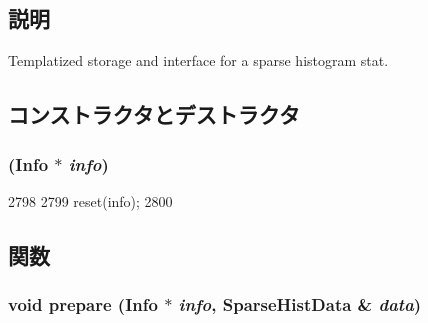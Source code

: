 \subsection{説明}
Templatized storage and interface for a sparse histogram stat. 

\subsection{コンストラクタとデストラクタ}
\hypertarget{classStats_1_1SparseHistStor_a967cbb09317bc988b824444b31e8d525}{
\subsubsection[{SparseHistStor}]{ ({\bf Info} $\ast$ {\em info})}}
\label{classStats_1_1SparseHistStor_a967cbb09317bc988b824444b31e8d525}



\begin{DoxyCode}
2798     {
2799         reset(info);
2800     }
\end{DoxyCode}


\subsection{関数}
\hypertarget{classStats_1_1SparseHistStor_a8bbe5515dd8959f8461c7e887c258270}{
\subsubsection[{prepare}]{\setlength{\rightskip}{0pt plus 5cm}void prepare ({\bf Info} $\ast$ {\em info}, \/  {\bf SparseHistData} \& {\em data})}}
\label{classStats_1_1SparseHistStor_a8bbe5515dd8959f8461c7e887c258270}



